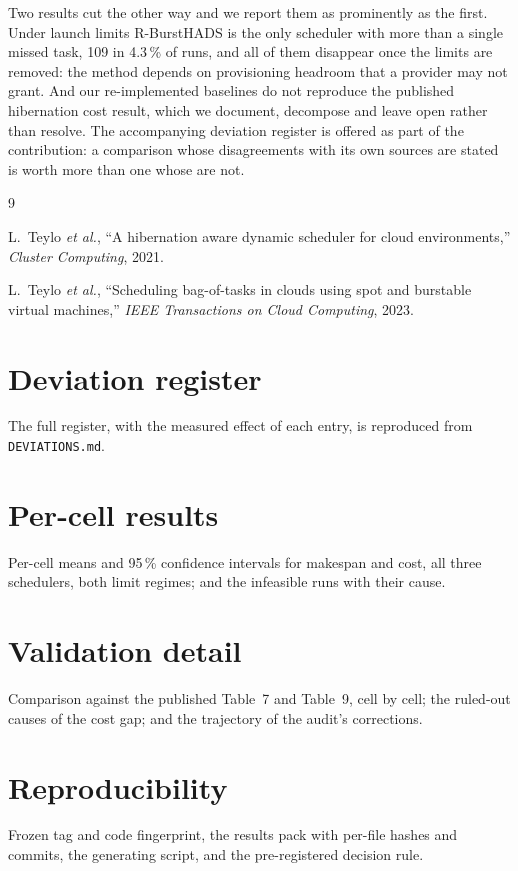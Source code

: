 \documentclass[conference]{IEEEtran}
\begin{document}
Two results cut the other way and we report them as prominently as the first.
Under launch limits R-BurstHADS is the only scheduler with more than a single
missed task, 109 in 4.3\,\% of runs, and all of them disappear once the limits
are removed: the method depends on provisioning headroom that a provider may not
grant. And our re-implemented baselines do not reproduce the published
hibernation cost result, which we document, decompose and leave open rather than
resolve. The accompanying deviation register is offered as part of the
contribution: a comparison whose disagreements with its own sources are stated
is worth more than one whose are not.


\begin{thebibliography}{9}

L.~Teylo \emph{et al.}, ``A hibernation aware dynamic scheduler for cloud
environments,'' \emph{Cluster Computing}, 2021.

L.~Teylo \emph{et al.}, ``Scheduling bag-of-tasks in clouds using spot and
burstable virtual machines,'' \emph{IEEE Transactions on Cloud Computing},
2023.

\end{thebibliography}

\appendices

\section{Deviation register}
The full register, with the measured effect of each entry, is reproduced from
\texttt{DEVIATIONS.md}.

\section{Per-cell results}
Per-cell means and 95\,\% confidence intervals for makespan and cost, all three
schedulers, both limit regimes; and the infeasible runs with their cause.

\section{Validation detail}
Comparison against the published Table~7 and Table~9, cell by cell; the
ruled-out causes of the cost gap; and the trajectory of the audit's
corrections.

\section{Reproducibility}
Frozen tag and code fingerprint, the results pack with per-file hashes and
commits, the generating script, and the pre-registered decision rule.
\end{document}
